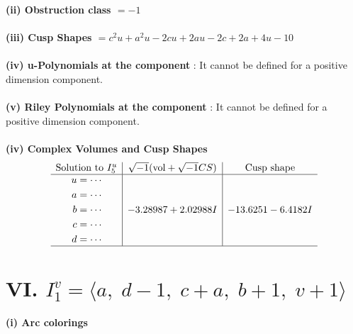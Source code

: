 \documentclass[1p]{elsarticle_modified}
\theoremstyle{definition}
\newcommand{\I}{\sqrt{-1}}
\begin{document}
\flushleft \textbf{(ii) Obstruction class $= -1$}\\~\\
\flushleft \textbf{(iii) Cusp Shapes $= c^2 u+a^2 u-2 c u+2 a u-2 c+2 a+4 u-10$}\\~\\
\flushleft \textbf{(iv) u-Polynomials at the component} : It cannot be defined for a positive dimension component.\\~\\
\flushleft \textbf{(v) Riley Polynomials at the component} : It cannot be defined for a positive dimension component.\\~\\
\newpage\flushleft \textbf{(iv) Complex Volumes and Cusp Shapes}
$$\begin{array}{c|c|c} 
\text{Solution to }I^u_{5}& \I (\text{vol} + \sqrt{-1}CS) & \text{Cusp shape}\\
 \hline 
\begin{aligned}
u &= \cdots \\
a &= \cdots \\
b &= \cdots \\
c &= \cdots \\
d &= \cdots\end{aligned}
 & -3.28987 + 2.02988 I & -13.6251 - 6.4182 I\\
 \hline 
 \end{array}
$$\newpage\renewcommand{\arraystretch}{1}
\centering \section*{VI. $I^v_{1}= \langle a,\;d-1,\;c+a,\;b+1,\;v+1 \rangle$}
\flushleft \textbf{(i) Arc colorings}\\
\end{document}
